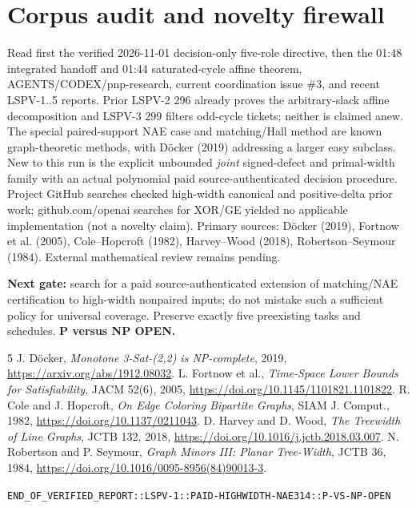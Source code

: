 \documentclass[11pt]{article}
\begin{document}
\section{Corpus audit and novelty firewall}
Read first the verified 2026-11-01 decision-only five-role directive, then the 01:48 integrated handoff and 01:44 saturated-cycle affine theorem, AGENTS/CODEX/pnp-research, current coordination issue \#3, and recent LSPV-1..5 reports. Prior LSPV-2 296 already proves the arbitrary-slack affine decomposition and LSPV-3 299 filters odd-cycle tickets; neither is claimed anew. The special paired-support NAE case and matching/Hall method are known graph-theoretic methods, with D\"ocker (2019) addressing a larger easy subclass. New to this run is the explicit unbounded \emph{joint} signed-defect and primal-width family with an actual polynomial paid source-authenticated decision procedure. Project GitHub searches checked high-width canonical and positive-delta prior work; github.com/openai searches for XOR/GE yielded no applicable implementation (not a novelty claim). Primary sources: D\"ocker (2019), Fortnow et al. (2005), Cole--Hopcroft (1982), Harvey--Wood (2018), Robertson--Seymour (1984). External mathematical review remains pending.
\par\noindent\textbf{Next gate:} search for a paid source-authenticated extension of matching/NAE certification to high-width nonpaired inputs; do not mistake such a sufficient policy for universal coverage. Preserve exactly five preexisting tasks and schedules. \textbf{P versus NP OPEN.}
\begin{thebibliography}{5}
 J. D\"ocker, \emph{Monotone 3-Sat-(2,2) is NP-complete}, 2019, \url{https://arxiv.org/abs/1912.08032}.
 L. Fortnow et al., \emph{Time-Space Lower Bounds for Satisfiability}, JACM 52(6), 2005, \url{https://doi.org/10.1145/1101821.1101822}.
 R. Cole and J. Hopcroft, \emph{On Edge Coloring Bipartite Graphs}, SIAM J. Comput., 1982, \url{https://doi.org/10.1137/0211043}.
 D. Harvey and D. Wood, \emph{The Treewidth of Line Graphs}, JCTB 132, 2018, \url{https://doi.org/10.1016/j.jctb.2018.03.007}.
 N. Robertson and P. Seymour, \emph{Graph Minors III: Planar Tree-Width}, JCTB 36, 1984, \url{https://doi.org/10.1016/0095-8956(84)90013-3}.
\end{thebibliography}
\noindent\texttt{END\_OF\_VERIFIED\_REPORT::LSPV-1::PAID-HIGHWIDTH-NAE314::P-VS-NP-OPEN}
\end{document}
